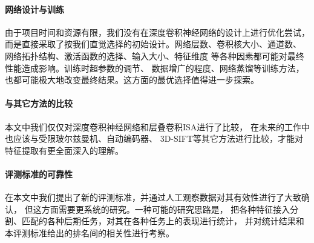 \paragraph{网络设计与训练}
由于项目时间和资源有限，我们没有在深度卷积神经网络的设计上进行优化尝试，
而是直接采取了按我们直觉选择的初始设计。网络层数、卷积核大小、通道数、
网络拓扑结构、激活函数的选择、输入大小、特征维度
等各种因素都可能对最终性能造成影响。训练时超参数的调节、
数据增广的程度、网络蒸馏\cite{hinton2015distilling}等训练方法，
也都可能极大地改变最终结果。这方面的最优选择值得进一步探索。

\paragraph{与其它方法的比较}
本文中我们仅仅对深度卷积神经网络和层叠卷积ISA进行了比较，
在未来的工作中也应该与受限玻尔兹曼机、自动编码器、
3D-SIFT等其它方法进行比较，才能对特征提取有更全面深入的理解。

\paragraph{评测标准的可靠性}
在本文中我们提出了新的评测标准，并通过人工观察数据对其有效性进行了大致确认，
但这方面需要更系统的研究。一种可能的研究思路是，
把各种特征接入分割、匹配的各种后期任务，对其在各种任务上的表现进行统计，
并对统计结果和本评测标准给出的排名间的相关性进行考察。


